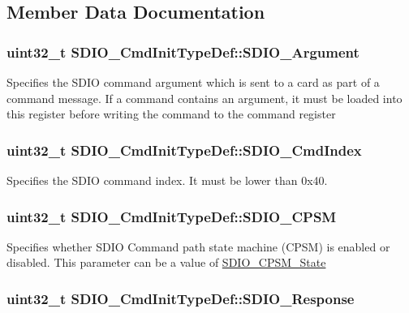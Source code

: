 \subsection{Member Data Documentation}
\hypertarget{structSDIO__CmdInitTypeDef_a37dfc4d7191ec10cffdb05ecf58d4807}{
\subsubsection[{SDIO\_\-Argument}]{\setlength{\rightskip}{0pt plus 5cm}uint32\_\-t {\bf SDIO\_\-CmdInitTypeDef::SDIO\_\-Argument}}}
\label{structSDIO__CmdInitTypeDef_a37dfc4d7191ec10cffdb05ecf58d4807}
Specifies the SDIO command argument which is sent to a card as part of a command message. If a command contains an argument, it must be loaded into this register before writing the command to the command register \hypertarget{structSDIO__CmdInitTypeDef_ab5e1df1f0e8d48a308edfb59a6f80fb4}{
\subsubsection[{SDIO\_\-CmdIndex}]{\setlength{\rightskip}{0pt plus 5cm}uint32\_\-t {\bf SDIO\_\-CmdInitTypeDef::SDIO\_\-CmdIndex}}}
\label{structSDIO__CmdInitTypeDef_ab5e1df1f0e8d48a308edfb59a6f80fb4}
Specifies the SDIO command index. It must be lower than 0x40. \hypertarget{structSDIO__CmdInitTypeDef_ab0e869ae285cc132478dd743c28cd8e2}{
\subsubsection[{SDIO\_\-CPSM}]{\setlength{\rightskip}{0pt plus 5cm}uint32\_\-t {\bf SDIO\_\-CmdInitTypeDef::SDIO\_\-CPSM}}}
\label{structSDIO__CmdInitTypeDef_ab0e869ae285cc132478dd743c28cd8e2}
Specifies whether SDIO Command path state machine (CPSM) is enabled or disabled. This parameter can be a value of \hyperlink{group__SDIO__CPSM__State}{SDIO\_\-CPSM\_\-State} \hypertarget{structSDIO__CmdInitTypeDef_aecb203e21321126d5f05c34787cacfd2}{
\subsubsection[{SDIO\_\-Response}]{\setlength{\rightskip}{0pt plus 5cm}uint32\_\-t {\bf SDIO\_\-CmdInitTypeDef::SDIO\_\-Response}}}
